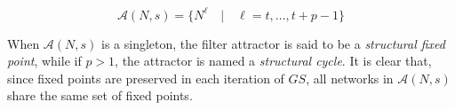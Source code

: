 \documentclass[preprint,12pt]{elsarticle}
\newcommand{\GS}{\textit{GS}}
\begin{document}
$$\mathcal{A}(N,s)=\{N^{\ell} \quad| \quad \ell =t,\ldots,t+p-1\}$$ 

When $\mathcal{A}(N,s)$ is a singleton, the filter attractor is said to be a \textit{structural fixed point}, while if $p>1$, the attractor is named a \textit{structural cycle}. It is clear that, since fixed points are preserved in each iteration of $\GS$, %
all networks in $\mathcal{A}(N,s)$ share the same set of fixed points.
\end{document}
